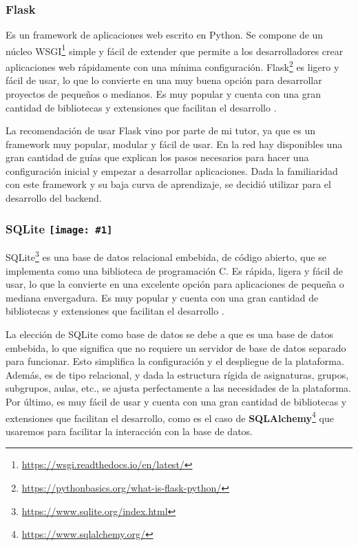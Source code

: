 \subsubsection*{Flask \protect{}}

Es un framework de aplicaciones web escrito en Python. Se compone de un núcleo WSGI\footnote{\url{https://wsgi.readthedocs.io/en/latest/}} simple y fácil de extender que permite a los desarrolladores crear aplicaciones web rápidamente con una mínima configuración. Flask\footnote{\url{https://pythonbasics.org/what-is-flask-python/}} es ligero y fácil de usar, lo que lo convierte en una muy buena opción para desarrollar proyectos de pequeños o medianos. Es muy popular y cuenta con una gran cantidad de bibliotecas y extensiones que facilitan el desarrollo \cite{grinberg2018flask}.\newline

La recomendación de usar Flask vino por parte de mi tutor, ya que es un framework muy popular, modular y fácil de usar. En la red hay disponibles una gran cantidad de guías que explican los pasos necesarios para hacer una configuración inicial y empezar a desarrollar aplicaciones. Dada la familiaridad con este framework y su baja curva de aprendizaje, se decidió utilizar para el desarrollo del backend.

\renewcommand{\icon}[1]{\texttt{[image: \#1]}}
\subsubsection*{SQLite \protect\icon{./imagenes/sqlite_logo.png}}

SQLite\footnote{\url{https://www.sqlite.org/index.html}} es una base de datos relacional embebida, de código abierto, que se implementa como una biblioteca de programación C. Es rápida, ligera y fácil de usar, lo que la convierte en una excelente opción para aplicaciones de pequeña o mediana envergadura. Es muy popular y cuenta con una gran cantidad de bibliotecas y extensiones que facilitan el desarrollo \cite{kreibich2010using}.\newline

La elección de SQLite como base de datos se debe a que es una base de datos embebida, lo que significa que no requiere un servidor de base de datos separado para funcionar. Esto simplifica la configuración y el despliegue de la plataforma. Además, es de tipo relacional, y dada la estructura rígida de asignaturas, grupos, subgrupos, aulas, etc., se ajusta perfectamente a las necesidades de la plataforma. Por último, es muy fácil de usar y cuenta con una gran cantidad de bibliotecas y extensiones que facilitan el desarrollo, como es el caso de \textbf{SQLAlchemy}\footnote{\url{https://www.sqlalchemy.org/}} que usaremos para facilitar la interacción con la base de datos.

